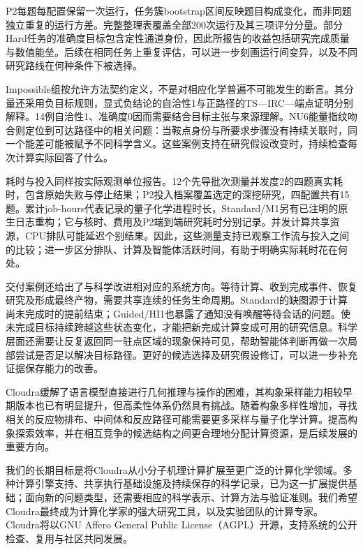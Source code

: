 P2每题每配置保留一次运行，任务簇bootstrap区间反映题目构成变化，而非同题独立重复的运行方差。完整整理表覆盖全部200次运行及其三项评分分量。部分Hard任务的准确度目标包含定性通道身份，因此所报告的收益包括研究完成质量与数值能垒。后续在相同任务上重复评估，可以进一步刻画运行间变异，以及不同研究路线在何种条件下被选择。

Impossible组按允许方法契约定义，不是对相应化学普遍不可能发生的断言。其分量还采用负目标规则，显式负结论的自洽性1与正路径的TS—IRC—端点证明分别解释。14例自洽性1、准确度0因而需要结合目标主张与来源理解。NU6能量指纹吻合则定位到可达路径中的相关问题：当鞍点身份与所要求步骤没有持续关联时，同一个能差可能被赋予不同科学含义。这些案例支持在研究假设改变时，持续检查每次计算实际回答了什么。

耗时与投入同样按实际观测单位报告。12个先导批次测量并发度2的四题真实耗时，包含原始失败与停止结果；P2投入档案覆盖选定的深挖研究，四配置共有15题。累计job-hours代表记录的量子化学进程时长，Standard/M1另有已注明的原生日志重构；它与核时、费用及P2端到端研究耗时分别记录。并发计算共享资源，CPU排队可能延迟个别结果。因此，这些测量支持已观察工作流与投入之间的比较；进一步区分排队、计算及智能体活跃时间，有助于明确实际耗时花在何处。

交付案例还给出了与科学改进相对应的系统方向。等待计算、收到完成事件、恢复研究及形成最终产物，需要共享连续的任务生命周期。Standard的缺图源于计算尚未完成时的提前结束；Guided/HI1也暴露了通知没有唤醒等待会话的问题。使未完成目标持续跨越这些状态变化，才能把新完成计算变成可用的研究信息。科学层面还需要让反复返回同一驻点区域的现象保持可见，帮助智能体判断再做一次局部尝试是否足以解决目标路径。更好的候选选择及研究假设修订，可以进一步补充证据保存能力的改善。

Cloudra缓解了语言模型直接进行几何推理与操作的困难，其构象采样能力相较早期版本也已有明显提升，但高柔性体系仍然具有挑战。随着构象多样性增加，寻找相关的反应物排布、中间体和反应路径可能需要更多采样与量子化学计算。提高构象探索效率，并在相互竞争的候选结构之间更合理地分配计算资源，是后续发展的重要方向。

我们的长期目标是将Cloudra从小分子机理计算扩展至更广泛的计算化学领域。多种计算引擎支持、共享执行基础设施及持续保存的科学记录，已为这一扩展提供基础；面向新的问题类型，还需要相应的科学表示、计算方法与验证准则。我们希望Cloudra最终成为计算化学家的强大研究工具，以及实验团队的计算专家。Cloudra将以GNU Affero General Public License（AGPL）开源，支持系统的公开检查、复用与社区共同发展。
